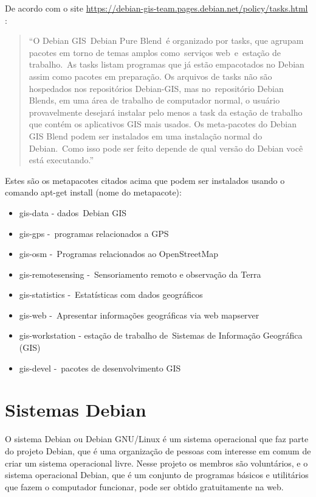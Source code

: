 De acordo com o site \url{https://debian-gis-team.pages.debian.net/policy/tasks.html} \cite{bib:gis}:

\begin{quote}
	``O Debian GIS Debian Pure Blend é organizado por tasks, que agrupam pacotes em torno de temas amplos como serviços web e estação de trabalho. As tasks listam programas que já estão empacotados no Debian assim como pacotes em preparação. Os arquivos de tasks não são hospedados nos repositórios Debian-GIS, mas no repositório Debian Blends, em uma área de trabalho de computador normal, o usuário provavelmente desejará instalar pelo menos a task da estação de trabalho que contém os aplicativos GIS mais usados. Os meta-pacotes do Debian GIS Blend podem ser instalados em uma instalação normal do Debian. Como isso pode ser feito depende de qual versão do Debian você está executando.''  
\end{quote}

Estes são os metapacotes citados acima que podem ser instalados usando o comando apt-get install (nome do metapacote):

\begin{itemize}
	\item gis-data - dados Debian GIS
	\item gis-gps - programas relacionados a GPS
	\item gis-osm - Programas relacionados ao OpenStreetMap
	\item gis-remotesensing - Sensoriamento remoto e observação da Terra
	\item gis-statistics - Estatísticas com dados geográficos
	\item gis-web - Apresentar informações geográficas via web mapserver
	\item gis-workstation - estação de trabalho de Sistemas de Informação Geográfica (GIS)
	\item gis-devel - pacotes de desenvolvimento GIS

\end{itemize}

\section{Sistemas Debian}
O sistema Debian ou Debian GNU/Linux é um sistema operacional que faz parte do projeto Debian, que é uma organização de pessoas com interesse em comum de criar um sistema operacional livre. Nesse projeto os membros são voluntários, e o sistema operacional Debian, que é um conjunto de programas básicos e utilitários que fazem o computador funcionar, pode ser obtido gratuitamente na web.

